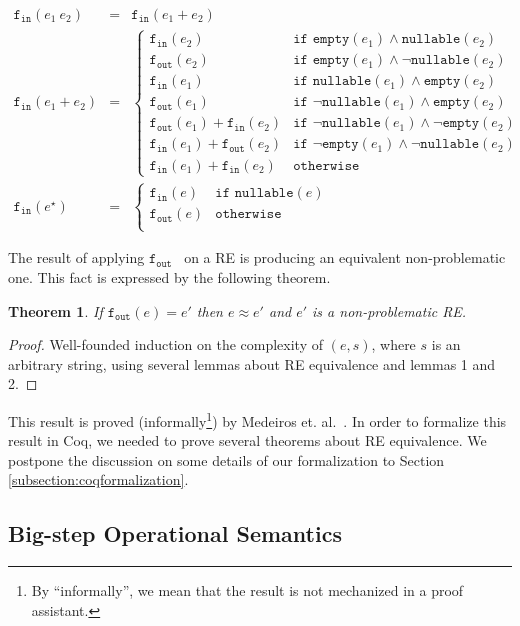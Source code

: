 \documentclass[oneside,12pt]{scrbook}
\newtheorem{Theorem}{Theorem}
\theoremstyle{definition}
\newcommand{\nullable}{\ensuremath{\texttt{nullable}}}
\newcommand{\emptyy}{\ensuremath{\texttt{empty}}}
\newcommand{\fin}{\ensuremath{\texttt{f$_{\texttt{in}}$}}}
\newcommand{\fout}{\ensuremath{\texttt{f$_{\texttt{out}}$}}}
\theoremstyle{plain}
\theoremstyle{definition}
\begin{document}
\[
\begin{array}{lcl}
\fin(e_1\:e_2) & = & \fin(e_1+e_2)\\
\fin(e_1 + e_2) & = & \left\{
\begin{array}{ll}
\fin(e_2)  & \texttt{if }\emptyy(e_1) \land \nullable(e_2)\\
\fout(e_2) & \texttt{if }\emptyy(e_1) \land \neg \nullable(e_2)\\
\fin(e_1)  & \texttt{if }\nullable(e_1) \land \emptyy(e_2)\\
\fout(e_1) & \texttt{if }\neg \nullable(e_1) \land \emptyy(e_2)\\
\fout(e_1) + \fin(e_2) & \texttt{if }\neg \nullable(e_1) \land \neg\emptyy(e_2)\\
\fin(e_1) + \fout(e_2) & \texttt{if }\neg \emptyy(e_1) \land \neg \nullable(e_2)\\
\fin(e_1) + \fin(e_2) & \texttt{otherwise}
\end{array}
\right. \\
\fin(e^\star) & = & \left\{
\begin{array}{ll}
\fin(e) & \texttt{if }\nullable(e)\\
\fout(e) & \texttt{otherwise}\\
\end{array}
\right.
\end{array}
\]

The result of applying \fout~ on a RE is producing an equivalent non-problematic one. This fact is expressed
by the following theorem. 

\begin{Theorem}
	If $\fout(e) = e'$ then $e \approx e'$ and $e'$ is a non-problematic RE.
\end{Theorem}
\begin{proof}
	Well-founded induction on the complexity of $(e,s)$, where $s$ is an arbitrary string, using
	several lemmas about RE equivalence and lemmas 1 and 2.
\end{proof}

This result is proved (informally\footnote{By ``informally'', we mean that the
	result is not mechanized in a proof assistant.}) by Medeiros et. al.~\cite{Medeiros14}. In order to formalize this result
in Coq, we needed to prove several theorems about RE equivalence. We postpone the discussion on some details
of our formalization to Section \ref{subsection:coqformalization}.

\subsection{Big-step Operational Semantics}\label{subsection:bigstep}
\end{document}
